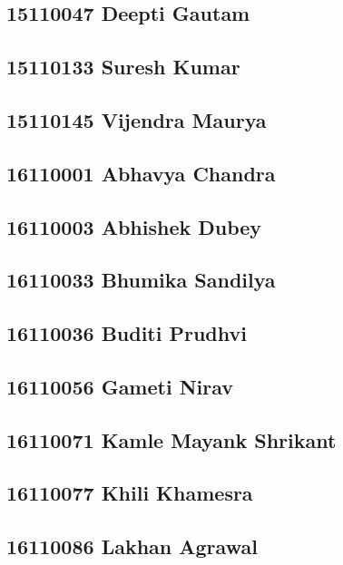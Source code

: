 \documentclass[journal=jpcbfk,manuscript=article]{achemso}
\begin{document}
\subsection {15110047	Deepti Gautam}

\subsection {15110133	Suresh Kumar}

\subsection {15110145	Vijendra Maurya}

\subsection {16110001	Abhavya Chandra}

\subsection {16110003	Abhishek Dubey}

\subsection {16110033	Bhumika Sandilya}

\subsection {16110036	Buditi Prudhvi}

\subsection {16110056	Gameti Nirav}

\subsection {16110071	Kamle Mayank Shrikant}

\subsection {16110077	Khili Khamesra}

\subsection {16110086	Lakhan Agrawal}
\end{document}
